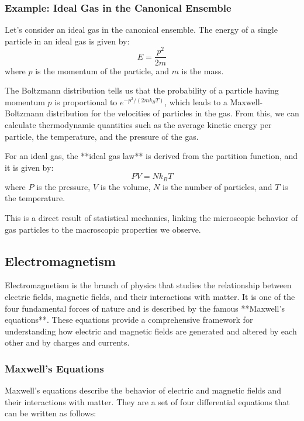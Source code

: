 \documentclass{article}
\begin{document}
\subsubsection*{Example: Ideal Gas in the Canonical Ensemble}

Let’s consider an ideal gas in the canonical ensemble. The energy of a single particle in an ideal gas is given by:
\[
E = \frac{p^2}{2m}
\]
where \( p \) is the momentum of the particle, and \( m \) is the mass.

The Boltzmann distribution tells us that the probability of a particle having momentum \( p \) is proportional to \( e^{-p^2/(2m k_B T)} \), which leads to a Maxwell-Boltzmann distribution for the velocities of particles in the gas. From this, we can calculate thermodynamic quantities such as the average kinetic energy per particle, the temperature, and the pressure of the gas.

For an ideal gas, the **ideal gas law** is derived from the partition function, and it is given by:
\[
PV = Nk_B T
\]
where \( P \) is the pressure, \( V \) is the volume, \( N \) is the number of particles, and \( T \) is the temperature.

This is a direct result of statistical mechanics, linking the microscopic behavior of gas particles to the macroscopic properties we observe.

\subsection{Electromagnetism}

Electromagnetism is the branch of physics that studies the relationship between electric fields, magnetic fields, and their interactions with matter. It is one of the four fundamental forces of nature and is described by the famous **Maxwell's equations**. These equations provide a comprehensive framework for understanding how electric and magnetic fields are generated and altered by each other and by charges and currents.

\subsubsection*{Maxwell's Equations}

Maxwell's equations describe the behavior of electric and magnetic fields and their interactions with matter. They are a set of four differential equations that can be written as follows:
\end{document}
